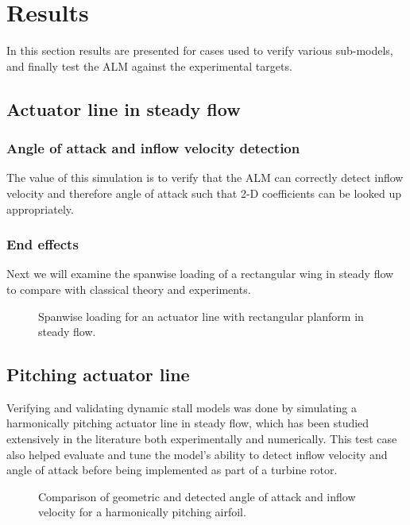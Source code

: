 \section{Results}

In this section results are presented for cases used to verify various
sub-models, and finally test the ALM against the experimental targets.


\subsection{Actuator line in steady flow}

\subsubsection{Angle of attack and inflow velocity detection}

The value of this simulation is to verify that the ALM can correctly detect
inflow velocity and therefore angle of attack such that 2-D coefficients can be
looked up appropriately.


\subsubsection{End effects}

Next we will examine the spanwise loading of a rectangular wing in steady flow
to compare with classical theory and experiments.

\begin{figure}
    \caption{Spanwise loading for an actuator line with rectangular planform in steady flow.}
    
    \label{fig:AL-spanwise}
\end{figure}


\subsection{Pitching actuator line}

Verifying and validating dynamic stall models was done by simulating a
harmonically pitching actuator line in steady flow, which has been studied
extensively in the literature both experimentally and numerically. This test
case also helped evaluate and tune the model's ability to detect inflow velocity
and angle of attack before being implemented as part of a turbine rotor.

\begin{figure}
    \caption{Comparison of geometric and detected angle of attack and inflow
        velocity for a harmonically pitching airfoil.}
    
    \label{fig:pitching-alpha-U_rel}
\end{figure}

